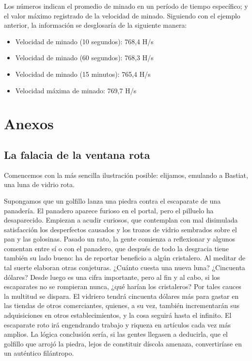 \documentclass[12pt,a4paper,twoside]{book}
\begin{document}
Los números indican el promedio de minado en un período de tiempo específico; y el valor máximo registrado de la velocidad de minado. Siguiendo con el ejemplo anterior, la información se desglosaría de la siguiente manera:

\begin{itemize}
\item Velocidad de minado (10 segundos): 768,4 H/s
\item Velocidad de minado (60 segundos): 768,3 H/s
\item Velocidad de minado (15 minutos): 765,4 H/s
\item Velocidad máxima de minado: 769,7 H/s
\end{itemize}

\part{Anexos}
\chapter{La falacia de la ventana rota}
Comencemos con la más sencilla ilustración posible: elijamos, emulando a Bastiat, una luna de vidrio rota.

Supongamos que un golfillo lanza una piedra contra el escaparate de una panadería. El panadero aparece furioso en el portal, pero el pilluelo ha desaparecido. Empiezan a acudir curiosos, que contemplan con mal disimulada satisfacción los desperfectos causados y los trozos de vidrio sembrados sobre el pan y las golosinas. Pasado un rato, la gente comienza a reflexionar y algunos comentan entre sí o con el panadero, que después de todo la desgracia tiene también su lado bueno: ha de reportar beneficio a algún cristalero. Al meditar de tal suerte elaboran otras conjeturas. ¿Cuánto cuesta una nueva luna? ¿Cincuenta dólares? Desde luego es una cifra importante, pero al fin y al cabo, si los escaparates no se rompieran nunca, ¿qué harían los cristaleros? Por tales cauces la multitud se dispara. El vidriero tendrá cincuenta dólares más para gastar en las tiendas de otros comerciantes, quienes, a su vez, también incrementarán sus adquisiciones en otros establecimientos, y la cosa seguirá hasta el infinito. El escaparate roto irá engendrando trabajo y riqueza en artículos cada vez más amplios. La lógica conclusión sería, si las gentes llegasen a deducirla, que el golfillo que arrojó la piedra, lejos de constituir díscola amenaza, convertiríase en un auténtico filántropo.
\end{document}
